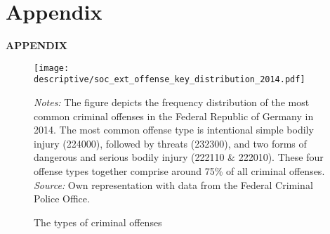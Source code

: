 \documentclass[11pt, a4paper]{article} %
\begin{document}
\newpage
\TODO\section{Appendix}
\vspace*{\fill}
{\Huge \begin{center}\textbf{APPENDIX}\end{center}}
\vspace*{\fill}\clearpage


\renewcommand\thefigure{A\arabic{figure}}
\setcounter{figure}{0} 
\captionsetup[subfigure]{labelformat=parens}

\vspace*{\fill}
\begin{figure}[H]\centering
	\caption{The types of criminal offenses}\label{fig_soc_ext:offense_types_distribution_2014}
	\texttt{[image: descriptive/soc\_ext\_offense\_key\_distribution\_2014.pdf]}
	\begin{minipage}{0.95\linewidth}
		\scriptsize{\emph{Notes:} The figure depicts the frequency distribution of the most common criminal offenses in the Federal Republic of Germany in 2014. The most common offense type is intentional simple bodily injury (224000), followed by threats (232300), and two forms of dangerous and serious bodily injury (222110 \& 222010). These four offense types together comprise around 75\% of all criminal offenses. \newline \emph{Source:} Own representation with data from the Federal Criminal Police Office.}
	\end{minipage}
\end{figure}
\vspace*{\fill}\clearpage
\end{document}
